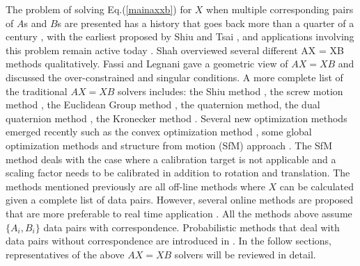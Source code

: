 \documentclass[twocolumn,10pt]{asme2ej}
\newcommand{\ttt}{{\bf t}}
\begin{document}
The problem of solving Eq.(\ref{mainaxxb}) for $X$ when multiple corresponding pairs of $A$s and $B$s are presented has a history that goes back more than a quarter of a century
\cite{chou1991finding, park1994robot,shiu1989calibration}, with the earliest proposed by Shiu \cite{shiu1987finding, shiu1989calibration} and Tsai \cite{tsai1989new}, and applications involving this problem remain active today \cite{kim,dai}. Shah \cite{shah2012overview} overviewed several different AX = XB methods qualitatively. Fassi and Legnani \cite{fassi2005hand} gave a geometric view of $AX=XB$ and discussed the over-constrained and singular conditions. A more complete list of the traditional $AX=XB$ solvers includes: the Shiu method \cite{shiu1989calibration}, the screw motion method \cite{chen91,zhao2006hand}, the Euclidean Group method \cite{park1994robot,gwak2003numerical}, the quaternion method\cite{chou1988quaternions, chou1991finding, horaud1995hand}, the dual quaternion method \cite{daniilidis1996dual, daniilidis1999hand}, the Kronecker method \cite{andreff1999line,andreff2001robot}. Several new optimization methods emerged recently such as the convex optimization method \cite{zhao2011hand}, some global optimization methods  \cite{seo2009branch,andreff2001robot,heller2014hand} and structure from motion (SfM) approach \cite{schmidt2005calibration}. The SfM method deals with the case where a calibration target is not applicable and a scaling factor needs to be calibrated in addition to rotation and translation. The methods mentioned previously are all off-line methods where $X$ can be calculated given a complete list of data pairs. However, several online methods are proposed that are more preferable to real time application \cite{andreff1999line,angeles2000online,ackerman2014online}. All the methods above assume $\{A_i, B_i\}$ data pairs with correspondence. Probabilistic methods that deal with data pairs without correspondence are introduced in \cite{ackermanGSI, ackerman2014information}. In the follow sections, representatives of the above $AX=XB$ solvers will be reviewed in detail.

\end{document}
